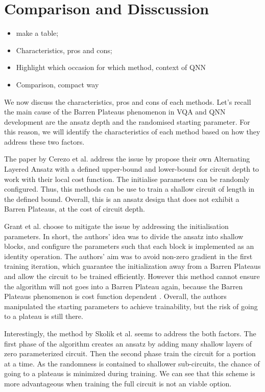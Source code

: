 \section{Comparison and Disscussion}
\begin{itemize}
    \item make a table;
    \item Characteristics, pros and cons;
    \item Highlight which occasion for which method, context of QNN
    \item Comparison, compact way
\end{itemize}

We now discuss the characteristics, pros and cons of each methods.
Let's recall the main cause of the Barren Plateaus phenomenon in VQA and QNN development are the ansatz depth and the randomised starting parameter.
For this reason, we will identify the characteristics of each method based on how they address these two factors.

The paper \cite{cerezoCostFunctionDependent2021} by Cerezo et al. address the issue by propose their own Alternating Layered Ansatz with a defined upper-bound and lower-bound for circuit depth to work with their local cost function. 
The initialise parameters can be randomly configured.
Thus, this methods can be use to train a shallow circuit of length in the defined bound. 
Overall, this is an ansatz design that does not exhibit a Barren Plateaus, at the cost of circuit depth.

Grant et al. \cite{grantInitializationStrategyAddressing2019} choose to mitigate the issue by addressing the initialisation parameters. 
In short, the authors' idea was to divide the ansatz into shallow blocks, and configure the parameters such that each block is implemented as an identity operation.
The authors' aim was to avoid non-zero gradient in the first training iteration, which guarantee the initialization away from a Barren Plateaus and allow the circuit to be trained efficiently.
However this method cannot ensure the algorithm will not goes into a Barren Plateau again, because the Barren Plateaus phenomenon is cost function dependent \cite{cerezoCostFunctionDependent2021}.
Overall, the authors manipulated the starting parameters to achieve trainability, but the risk of going to a plateau is still there.

Interestingly, the method by Skolik et al. \cite{skolikLayerwiseLearningQuantum2021} seems to address the both factors.
The first phase of the algorithm creates an ansatz by adding many shallow layers of zero parameterized circuit. 
Then the second phase train the circuit for a portion at a time.
As the randomness is contained to shallower sub-circuits, the chance of going to a plateaus is minimized during training.
We can see that this scheme is more advantageous when training the full circuit is not an viable option.